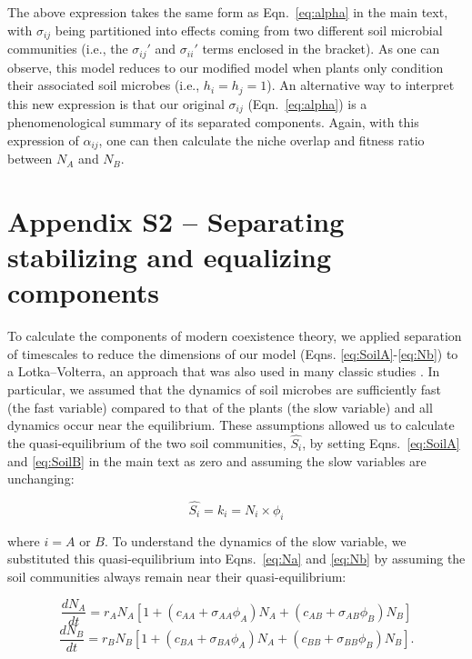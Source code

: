 \noindent The above expression takes the same form as Eqn.~\ref{eq:alpha} in the main text, with $\sigma_{ij}$ being partitioned into effects coming from two different soil microbial communities (i.e., the $\sigma_{ij}'$ and $\sigma_{ii}'$ terms enclosed in the bracket).
As one can observe, this model reduces to our modified \citet{Eppinga2006} model when plants only condition their associated soil microbes (i.e., $h_{i}=h_{j}=1$). An alternative way to interpret this new expression is that our original $\sigma_{ij}$ (Eqn.~\ref{eq:alpha}) is a phenomenological summary of its separated components. Again, with this expression of $\alpha_{ij}$, one can then calculate the niche overlap and fitness ratio between $N_{A}$ and $N_{B}$.
\par



\section{Appendix S2 -- Separating stabilizing and equalizing components}
To calculate the components of modern coexistence theory, we applied separation of timescales to reduce the dimensions of our model (Eqns. \ref{eq:SoilA}-\ref{eq:Nb}) to a Lotka--Volterra, an approach that was also used in many classic studies \citep{MacArthur1970, Chesson1990}. In particular, we assumed that the dynamics of soil microbes are sufficiently fast (the fast variable) compared to that of the plants (the slow variable) and all dynamics occur near the equilibrium. These assumptions allowed us to calculate the quasi-equilibrium of the two soil communities, $\hat{S_{i}}$, by setting Eqns.~\ref{eq:SoilA} and \ref{eq:SoilB} in the main text as zero and assuming the slow variables are unchanging:

\begin{equation}
\hat{S_{i}}= k_{i}= N_{i} \times \phi_{i}
\tag{S4.14} \label{eq:QuasiSoil}
\end{equation}

\noindent where $i = A$ or $B$. To understand the dynamics of the slow variable, we substituted this quasi-equilibrium into Eqns.~\ref{eq:Na} and \ref{eq:Nb} by assuming the soil communities always remain near their quasi-equilibrium:

\begin{equation}
\frac{dN_{A}}{dt } = r_{A}N_{A}\left [1 + \left(c_{AA}+\sigma_{AA}\phi_{A}\right)N_{A} + \left(c_{AB}+\sigma_{AB}\phi_{B}\right)N_{B}\right ]
\tag{S4.15}\label{eq:NaLV}
\end{equation}
\begin{equation}
\frac{dN_{B}}{dt } = r_{B}N_{B}\left [1 + \left(c_{BA}+\sigma_{BA}\phi_{A}\right)N_{A} + \left(c_{BB}+\sigma_{BB}\phi_{B}\right)N_{B}\right ] .
\tag{S4.16}\label{eq:NbLV}
\end{equation}

